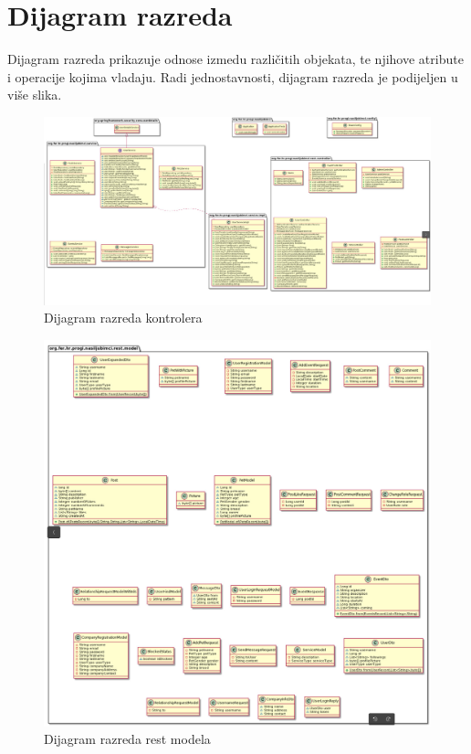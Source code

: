 			\eject
			
			
		\section{Dijagram razreda}
		
			Dijagram razreda prikazuje odnose izmedu različitih objekata, te njihove atribute
			i operacije kojima vladaju. Radi jednostavnosti, dijagram razreda je
			podijeljen u više slika.
			
			\begin{figure}[H]
				\includegraphics[scale=0.3]{slike/controller.jpeg} %
				\centering
				\caption{Dijagram razreda kontrolera}
			\end{figure}
		
			\begin{figure}[H]
				\includegraphics[scale=0.34]{slike/rest_model.jpeg} %
				\centering
				\caption{Dijagram razreda rest modela}
			\end{figure}
		
